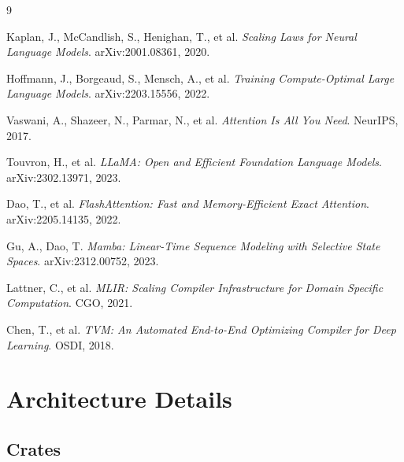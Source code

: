 \documentclass[11pt]{article}
\begin{document}

\begin{thebibliography}{9}

Kaplan, J., McCandlish, S., Henighan, T., et al.
\newblock \emph{Scaling Laws for Neural Language Models}.
\newblock arXiv:2001.08361, 2020.

Hoffmann, J., Borgeaud, S., Mensch, A., et al.
\newblock \emph{Training Compute-Optimal Large Language Models}.
\newblock arXiv:2203.15556, 2022.

Vaswani, A., Shazeer, N., Parmar, N., et al.
\newblock \emph{Attention Is All You Need}.
\newblock NeurIPS, 2017.

Touvron, H., et al.
\newblock \emph{LLaMA: Open and Efficient Foundation Language Models}.
\newblock arXiv:2302.13971, 2023.

Dao, T., et al.
\newblock \emph{FlashAttention: Fast and Memory-Efficient Exact Attention}.
\newblock arXiv:2205.14135, 2022.

Gu, A., Dao, T.
\newblock \emph{Mamba: Linear-Time Sequence Modeling with Selective State Spaces}.
\newblock arXiv:2312.00752, 2023.

Lattner, C., et al.
\newblock \emph{MLIR: Scaling Compiler Infrastructure for Domain Specific Computation}.
\newblock CGO, 2021.

Chen, T., et al.
\newblock \emph{TVM: An Automated End-to-End Optimizing Compiler for Deep Learning}.
\newblock OSDI, 2018.

\end{thebibliography}

\appendix
\section{Architecture Details}

\subsection{Crates}
\end{document}
